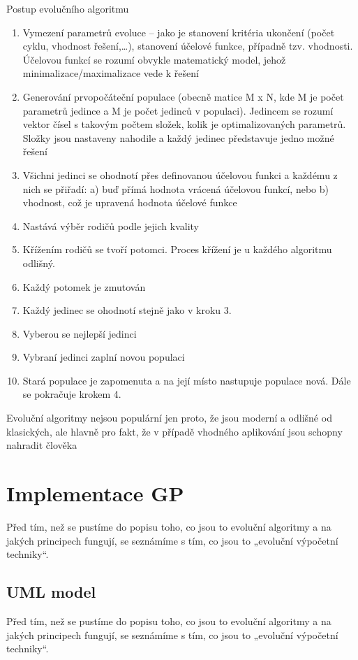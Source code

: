 \documentclass[bc,male,java,dept460]{diploma}		%
\begin{document}
\begin{example}
\label{priklad}
Postup evolučního algoritmu
\begin{enumerate}
\item Vymezení parametrů evoluce – jako je stanovení kritéria ukončení (počet cyklu, vhodnost řešení,…), stanovení účelové funkce, případně tzv. vhodnosti. Účelovou funkcí se rozumí obvykle matematický model, jehož minimalizace/maximalizace vede k řešení
\item Generování prvopočáteční populace (obecně matice M x N, kde M je počet parametrů jedince a M je počet jedinců v populaci). Jedincem se rozumí vektor čísel s takovým počtem složek, kolik je optimalizovaných parametrů. Složky jsou nastaveny nahodile a každý jedinec představuje jedno možné řešení
\item Všichni jedinci se ohodnotí přes definovanou účelovou funkci a každému z nich se přiřadí: a) buď přímá hodnota vrácená účelovou funkcí, nebo b) vhodnost, což je upravená hodnota účelové funkce
\item Nastává výběr rodičů podle jejich kvality
\item Křížením rodičů se tvoří potomci. Proces křížení je u každého algoritmu odlišný.
\item Každý potomek je zmutován
\item Každý jedinec se ohodnotí stejně jako v kroku 3.
\item Vyberou se nejlepší jedinci
\item Vybraní jedinci zaplní novou populaci
\item Stará populace je zapomenuta a na její místo nastupuje populace nová. Dále se pokračuje krokem 4.
\end{enumerate}
Evoluční algoritmy nejsou populární jen proto, že jsou moderní a odlišné od klasických, ale hlavně pro fakt, že v případě vhodného aplikování jsou schopny nahradit člověka
\end{example}

\section{Implementace GP}
Před tím, než se pustíme do popisu toho, co jsou to evoluční algoritmy a na jakých principech fungují, se seznámíme s tím, co jsou to „evoluční výpočetní techniky“.

\subsection{UML model}
Před tím, než se pustíme do popisu toho, co jsou to evoluční algoritmy a na jakých principech fungují, se seznámíme s tím, co jsou to „evoluční výpočetní techniky“.
\end{document}

